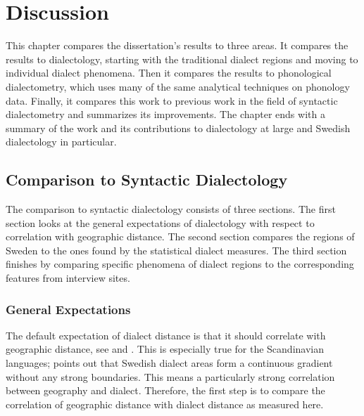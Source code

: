 \chapter{Discussion}
\label{discussion-chapter}

This chapter compares the dissertation's results to three areas. It
compares the results to dialectology, starting with the traditional
dialect regions and moving to individual dialect phenomena. Then it
compares the results to phonological dialectometry, which uses many of
the same analytical techniques on phonology data. Finally, it compares
this work to previous work in the field of syntactic dialectometry and
summarizes its improvements. The chapter ends with a summary of the
work and its contributions to dialectology at large and Swedish
dialectology in particular.



\section{Comparison to Syntactic Dialectology}

The comparison to syntactic dialectology consists of three
sections. The first section looks at the general expectations of
dialectology with respect to correlation with geographic distance. The
second section compares the regions of Sweden to the ones found by the
statistical dialect measures. The third section finishes by comparing
specific phenomena of dialect regions to the corresponding features
from interview sites.

\subsection{General Expectations}

The default expectation of dialect distance is that it should
correlate with geographic distance, see  and
. This is especially true for the Scandinavian
languages;  points out that Swedish dialect areas
form a continuous gradient without any strong boundaries. This means a
particularly strong correlation between geography and
dialect. Therefore, the first step is to compare the correlation of
geographic distance with dialect distance as measured
here.

